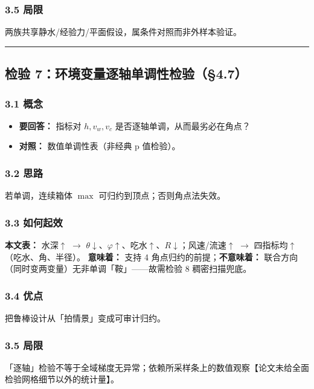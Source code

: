 \documentclass[UTF8,a4paper,zihao=-4]{ctexart}
\begin{document}
\subsubsection{\texorpdfstring{3.5 局限}{3.5 局限}}
两族共享静水/经验力/平面假设，属条件对照而非外样本验证。

\vspace{0.4em}\hrule\vspace{0.4em}

\subsection{\texorpdfstring{检验 7：环境变量逐轴单调性检验（§4.7）}{检验 7：环境变量逐轴单调性检验（§4.7）}}

\subsubsection{\texorpdfstring{3.1 概念}{3.1 概念}}
\begin{itemize}[leftmargin=1.5em]
\item \textbf{要回答：} 指标对 \(h,v_w,v_c\) 是否逐轴单调，从而最劣必在角点？
\item \textbf{对照：} 数值单调性表（非经典 p 值检验）。
\end{itemize}

\subsubsection{\texorpdfstring{3.2 思路}{3.2 思路}}
若单调，连续箱体 \(\max\) 可归约到顶点；否则角点法失效。

\subsubsection{\texorpdfstring{3.3 如何起效}{3.3 如何起效}}
\textbf{本文表：} 水深$\uparrow$ $\rightarrow$ \(\theta\)$\downarrow$、\(\varphi\)$\uparrow$、吃水$\uparrow$、\(R\)$\downarrow$；风速/流速$\uparrow$ $\rightarrow$ 四指标均$\uparrow$（吃水、角、半径）。  
\textbf{意味着：} 支持 4 角点归约的前提；\textbf{不意味着：} 联合方向（同时变两变量）无非单调「鞍」------故需检验 8 稠密扫描兜底。

\subsubsection{\texorpdfstring{3.4 优点}{3.4 优点}}
把鲁棒设计从「拍情景」变成可审计归约。

\subsubsection{\texorpdfstring{3.5 局限}{3.5 局限}}
「逐轴」检验不等于全域梯度无异常；依赖所采样条上的数值观察【论文未给全面检验网格细节以外的统计量】。
\end{document}
